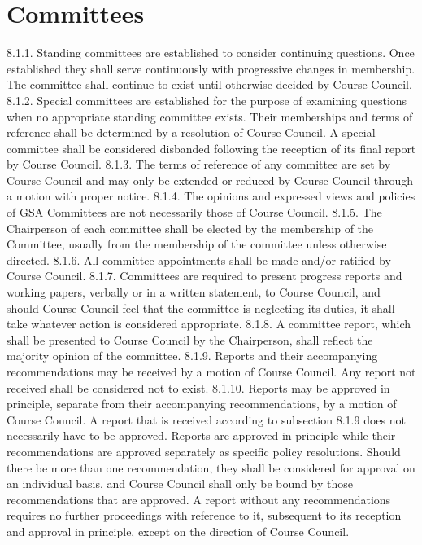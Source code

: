 \documentclass{article}
\begin{document}
\section{Committees }
8.1.1. Standing committees are established to consider continuing questions. 
Once established they shall serve continuously with progressive 
changes in membership. The committee shall continue to exist until 
otherwise decided by Course Council. 
8.1.2. Special committees are established for the purpose of examining 
questions when no appropriate standing committee exists. Their 
memberships and terms of reference shall be determined by a 
resolution of Course Council. A special committee shall be considered 
disbanded following the reception of its final report by Course 
Council. 
8.1.3. The terms of reference of any committee are set by Course Council 
and may only be extended or reduced by Course Council through a 
motion with proper notice. 
8.1.4. The opinions and expressed views and policies of GSA Committees 
are not necessarily those of Course Council. 
8.1.5. The Chairperson of each committee shall be elected by the 
membership of the Committee, usually from the membership of the 
committee unless otherwise directed. 
8.1.6. All committee appointments shall be made and/or ratified by Course 
Council. 
8.1.7. Committees are required to present progress reports and working 
papers, verbally or in a written statement, to Course Council, and 
should Course Council feel that the committee is neglecting its duties, 
it shall take whatever action is considered appropriate. 
8.1.8. A committee report, which shall be presented to Course Council by the 
Chairperson, shall reflect the majority opinion of the committee. 
8.1.9. Reports and their accompanying recommendations may be received by 
a motion of Course Council. Any report not received shall be 
considered not to exist. 
8.1.10. Reports may be approved in principle, separate from their 
accompanying recommendations, by a motion of Course Council. A 
report that is received according to subsection 8.1.9 does not 
necessarily have to be approved. Reports are approved in principle 
while their recommendations are approved separately as specific 
policy resolutions. Should there be more than one recommendation, 
they shall be considered for approval on an individual basis, and 
Course Council shall only be bound by those recommendations that 
are approved. A report without any recommendations requires no 
further proceedings with reference to it, subsequent to its reception and 
approval in principle, except on the direction of Course Council. 
\end{document}
